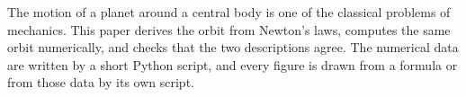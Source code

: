 The motion of a planet around a central body is one of the
classical problems of mechanics.
This paper derives the orbit from Newton's laws, computes the same orbit
numerically, and checks that the two descriptions agree.
The numerical data are written by a short Python script, and every figure
is drawn from a formula or from those data by its own script.
